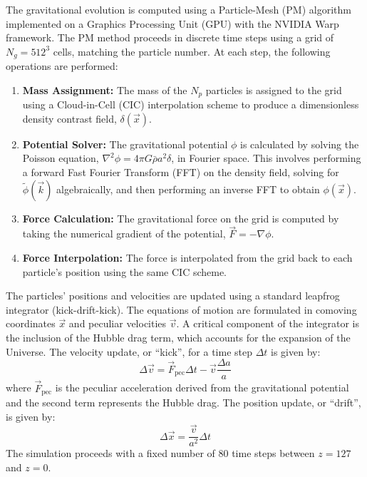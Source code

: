 \documentclass[]{article}
\begin{document}
The gravitational evolution is computed using a Particle-Mesh (PM) algorithm implemented on a Graphics Processing Unit (GPU) with the NVIDIA Warp framework. The PM method proceeds in discrete time steps using a grid of $N_g = 512^3$ cells, matching the particle number. At each step, the following operations are performed:
\begin{enumerate}
    \item \textbf{Mass Assignment:} The mass of the $N_p$ particles is assigned to the grid using a Cloud-in-Cell (CIC) interpolation scheme to produce a dimensionless density contrast field, $\delta(\vec{x})$.
    \item \textbf{Potential Solver:} The gravitational potential $\phi$ is calculated by solving the Poisson equation, $\nabla^2 \phi = 4 \pi G \bar{\rho} a^2 \delta$, in Fourier space. This involves performing a forward Fast Fourier Transform (FFT) on the density field, solving for $\tilde{\phi}(\vec{k})$ algebraically, and then performing an inverse FFT to obtain $\phi(\vec{x})$.
    \item \textbf{Force Calculation:} The gravitational force on the grid is computed by taking the numerical gradient of the potential, $\vec{F} = -\nabla \phi$.
    \item \textbf{Force Interpolation:} The force is interpolated from the grid back to each particle's position using the same CIC scheme.
\end{enumerate}

The particles' positions and velocities are updated using a standard leapfrog integrator (kick-drift-kick). The equations of motion are formulated in comoving coordinates $\vec{x}$ and peculiar velocities $\vec{v}$. A critical component of the integrator is the inclusion of the Hubble drag term, which accounts for the expansion of the Universe. The velocity update, or ``kick'', for a time step $\Delta t$ is given by:
\begin{equation}
\Delta \vec{v} = \vec{F}_{\text{pec}} \Delta t - \vec{v} \frac{\Delta a}{a}
\end{equation}
where $\vec{F}_{\text{pec}}$ is the peculiar acceleration derived from the gravitational potential and the second term represents the Hubble drag. The position update, or ``drift'', is given by:
\begin{equation}
\Delta \vec{x} = \frac{\vec{v}}{a^2} \Delta t
\end{equation}
The simulation proceeds with a fixed number of 80 time steps between $z=127$ and $z=0$.
\end{document}
